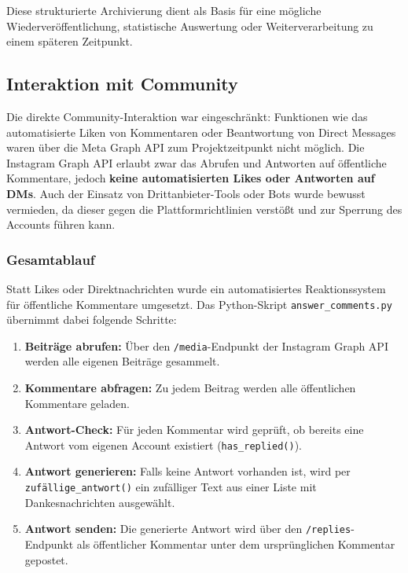 \documentclass[a4paper,12pt]{article}
\begin{document}
Diese strukturierte Archivierung dient als Basis für eine mögliche Wiederveröffentlichung, statistische Auswertung oder Weiterverarbeitung zu einem späteren Zeitpunkt.


\subsection{Interaktion mit Community}

Die direkte Community-Interaktion war eingeschränkt: Funktionen wie das automatisierte Liken von Kommentaren oder Beantwortung von Direct Messages waren über die Meta Graph API zum Projektzeitpunkt nicht möglich. Die Instagram Graph API erlaubt zwar das Abrufen und Antworten auf öffentliche Kommentare, jedoch \textbf{keine automatisierten Likes oder Antworten auf DMs}. Auch der Einsatz von Drittanbieter-Tools oder Bots wurde bewusst vermieden, da dieser gegen die Plattformrichtlinien verstößt und zur Sperrung des Accounts führen kann.

\subsubsection*{Gesamtablauf}

Statt Likes oder Direktnachrichten wurde ein automatisiertes Reaktionssystem für öffentliche Kommentare umgesetzt. Das Python-Skript \texttt{answer\_comments.py} übernimmt dabei folgende Schritte:

\begin{enumerate}
    \item \textbf{Beiträge abrufen:} Über den \texttt{/media}-Endpunkt der Instagram Graph API werden alle eigenen Beiträge gesammelt.
    
    \item \textbf{Kommentare abfragen:} Zu jedem Beitrag werden alle öffentlichen Kommentare geladen.
    
    \item \textbf{Antwort-Check:} Für jeden Kommentar wird geprüft, ob bereits eine Antwort vom eigenen Account existiert (\texttt{has\_replied()}).
    
    \item \textbf{Antwort generieren:} Falls keine Antwort vorhanden ist, wird per \texttt{zufällige\_antwort()} ein zufälliger Text aus einer Liste mit Dankesnachrichten ausgewählt.
    
    \item \textbf{Antwort senden:} Die generierte Antwort wird über den \texttt{/replies}-Endpunkt als öffentlicher Kommentar unter dem ursprünglichen Kommentar gepostet.
\end{enumerate}
\end{document}
